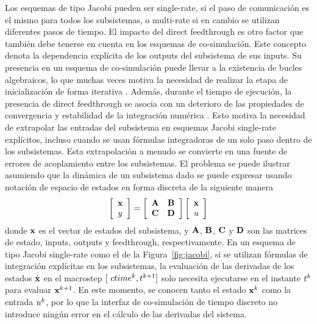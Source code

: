 Los esquemas de tipo Jacobi pueden ser single-rate, si el paso de comunicación es el mismo para todos los subsistemas, o multi-rate si en cambio se utilizan diferentes pasos de tiempo.
El impacto del direct feedthrough es otro factor que también debe tenerse en cuenta en los esquemas de co-simulación.
Este concepto denota la dependencia explícita de los outputs del subsistema de sus inputs.
Su presencia en un esquema de co-simulación puede llevar a la existencia de bucles algebraicos, lo que muchas veces motiva la necesidad de realizar la etapa de inicialización de forma iterativa \cite{Andersson2016}.
Además, durante el tiempo de ejecución, la presencia de direct feedthrough se asocia con un deterioro de las propiedades de convergencia y estabilidad de la integración numérica \cite{Arnold2013}.
Esto motiva la necesidad de extrapolar las entradas del subsistema en esquemas Jacobi single-rate explícitos, incluso cuando se usan fórmulas integradoras de un solo paso dentro de los subsistemas.
Esta extrapolación a menudo se convierte en una fuente de errores de acoplamiento entre los subsistemas.
El problema se puede ilustrar asumiendo que la dinámica de un subsistema dado se puede expresar usando notación de espacio de estados en forma discreta de la siguiente manera
%
\begin{equation}
	\sqbr{\matr{c}{\state \\ \outputs}} = \sqbr{\matr{cc}{\stateMatrix & \inputMatrix \\ \outputMatrix & \feedthrough}} \sqbr{\matr{c}{\state \\ \inputs}}
	\label{eq:statespace}
\end{equation}
%
donde $\mathbf{ x }$ es el vector de estados del subsistema, y $\mathbf{A}$, $\mathbf{B}$, $\mathbf{C}$ y $\mathbf{D}$ son las matrices de estado, inputs, outputs y feedthrough, respectivamente.
En un esquema de tipo Jacobi single-rate como el de la Figura~\ref{fig:jacobi}, si se utilizan fórmulas de integración explícitas en los subsistemas, la evaluación de las derivadas de los estados $\dot{\mathbf{ x }}$ en el macrostep $[\ ctime^{k}, t^{k + 1}]$ solo necesita ejecutarse en el instante $t^{k}$ para evaluar $\mathbf{ x }^{k + 1}$.
En este momento, se conocen tanto el estado $\mathbf{ x }^{k}$ como la entrada ${ u}^{k}$, por lo que la interfaz de co-simulación de tiempo discreto no introduce ningún error en el cálculo de las derivadas del sistema.

